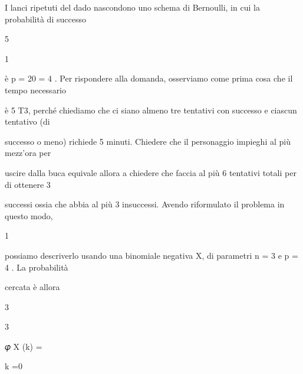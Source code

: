 \documentclass[a4paper,portrait,12pt]{article}
\begin{document}
\begin{flushleft}
I lanci ripetuti del dado nascondono uno schema di Bernoulli, in cui la probabilit\`{a} di successo
\end{flushleft}


5


1


\begin{flushleft}
\`{e} p = 20 = 4 . Per rispondere alla domanda, osserviamo come prima cosa che il tempo necessario
\end{flushleft}


\begin{flushleft}
\`{e} 5 T3, perch\'{e} chiediamo che ci siano almeno tre tentativi con successo e ciascun tentativo (di
\end{flushleft}


\begin{flushleft}
successo o meno) richiede 5 minuti. Chiedere che il personaggio impieghi al più mezz'ora per
\end{flushleft}


\begin{flushleft}
uscire dalla buca equivale allora a chiedere che faccia al più 6 tentativi totali per di ottenere 3
\end{flushleft}


\begin{flushleft}
successi ossia che abbia al più 3 insuccessi. Avendo riformulato il problema in questo modo,
\end{flushleft}


1


\begin{flushleft}
possiamo descriverlo usando una binomiale negativa X, di parametri n = 3 e p = 4 . La probabilit\`{a}
\end{flushleft}


\begin{flushleft}
cercata \`{e} allora
\end{flushleft}


3





3





\begin{flushleft}
𝜑 X (k) =
\end{flushleft}


\begin{flushleft}
k =0
\end{flushleft}
\end{document}
